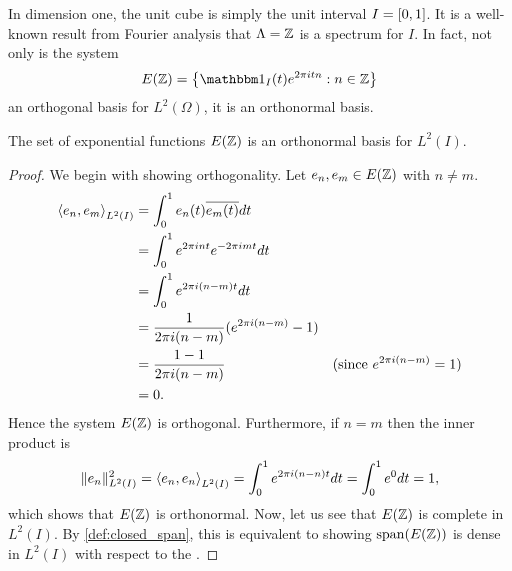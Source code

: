 \documentclass[../thesis.tex]{subfiles}
\begin{document}
In dimension one, the unit cube is simply the unit interval $I=[0,1]$. It is a well-known result from Fourier analysis that $\Lambda = \mathbb{Z}$ is a spectrum for $I$. In fact, not only is the system
\begin{equation*}
    E(\Z) = \braqMed{\indicator{I}{t} e^{2\pi i t n} : n \in \Z}
\end{equation*} 
an orthogonal basis for $L^2(\Omega)$, it is an orthonormal basis.
\begin{theorem}\label{lem:exp_onb_onedim}
    The set of exponential functions $E(\mathbb{Z})$ is an orthonormal basis for $L^2(I)$.
\end{theorem}
\begin{proof}
    We begin with showing orthogonality. Let $e_{n}, e_{m} \in E(\mathbb{Z})$ with $n \neq m$. %
    \begin{align}\label{eq:orthog_one_dim_req}
        \left \langle e_{n},e_{m}  \right \rangle_{L^2(I)} &= \int_0^1 e_{n}(t)\overline{e_{m}(t)} dt \nonumber\\ 
        &= \int_0^1 e^{2 \pi i {n}t} e^{-2 \pi i {m}t} dt \nonumber\\
        &= \int_0^1 e^{2 \pi i (n-m)t} dt \nonumber\\
        &=\frac{1}{2 \pi i (n-m)} (e^{2 \pi i (n - m)} -1) \\
        &=\frac{1-1}{2 \pi i (n-m)} & (\text{since } e^{2 \pi i (n-m)} = 1) \nonumber\\
        &= 0 \nonumber.
    \end{align}
    Hence the system $E(\mathbb{Z})$ is orthogonal. Furthermore, if $n =m$ then the inner product is
    \begin{align*}\label{eq:exp_norm_one}
        \| e_n \|^2_{L^2(I)} 
        = \left \langle e_{n},e_{n}  \right \rangle_{L^2(I)} 
        = \int_0^1 e^{2 \pi i (n-n)t} dt
        = \int_0^1 e^{0} dt = 1,
    \end{align*}
    which shows that $E(\mathbb{Z})$ is orthonormal. Now, let us see that $E(\mathbb{Z})$ is complete in $L^2(I)$. By \cref{def:closed_span}, this is equivalent to showing $\operatorname{span}(E(\mathbb{Z}))$ is dense in $L^2(I)$ with respect to the \Ltwonorm. 

\end{proof}
\end{document}
